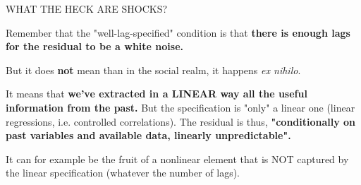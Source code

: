 \documentclass{beamer}
\begin{document}
\begin{frame}{WHAT THE HECK ARE SHOCKS?}

Remember that the "well-lag-specified" condition is that \textbf{there is enough lags for the residual to be a white noise. }

\medskip
But it does\textbf{ not }mean than in the social realm, it happens \textit{ex nihilo}.

\medskip
It means that \textbf{we've extracted in a LINEAR way all the useful information from the past.} But the specification is "only" a linear one (linear regressions, i.e. controlled correlations). The residual is thus, \textbf{"conditionally on past variables and available data, linearly unpredictable".}

\medskip
It can for example be the fruit of a nonlinear element that is NOT captured by the linear specification (whatever the number of lags). 
\end{frame}
\end{document}
